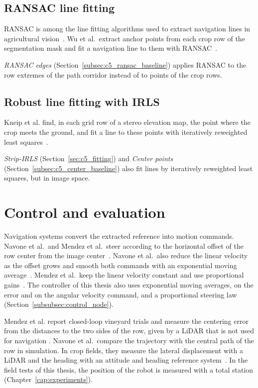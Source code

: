 \subsection{RANSAC line fitting}
\label{subsec:ransac_methods}

RANSAC is among the line fitting algorithms used to extract navigation
lines in agricultural vision~\cite{bai2023vision}. Wu et al.\ extract
anchor points from each crop row of the segmentation mask and fit a
navigation line to them with
RANSAC~\cite{wu2026deeplabv3}.

\textit{RANSAC edges} (Section~\ref{subsec:c5_ransac_baseline}) applies
RANSAC to the row extremes of the path corridor instead of to points of
the crop rows.

\subsection{Robust line fitting with IRLS}
\label{subsec:irls_methods}

Kneip et al. find, in each grid row of a stereo elevation map, the point
where the crop meets the ground, and fit a line to these points with
iteratively reweighted least
squares~\cite{kneip2020cropedge}.

\textit{Strip-IRLS} (Section~\ref{sec:c5_fitting}) and
\textit{Center points} (Section~\ref{subsec:c5_center_baseline}) also fit lines
by iteratively reweighted least squares,
but in image space.

\section{Control and evaluation}
\label{sec:system_integration}

Navigation systems convert the extracted reference into motion commands.
Navone et al.\ and Mendez et al.\ steer according to the
horizontal offset of the row center from the image
center~\cite{navone2025gpsfree,mendez2023vineyards}. Navone et al.\ also
reduce the linear velocity as the offset grows and smooth both
commands with an exponential moving
average~\cite{navone2025gpsfree}. Mendez et al.\ keep the
linear velocity constant and use proportional
gains~\cite{mendez2023vineyards}. The
controller of this thesis also uses exponential moving averages, on the error
and on the angular velocity command, and a proportional steering law
(Section~\ref{subsubsec:control_node}).

Mendez et al. report closed-loop vineyard trials and measure the
centering error from the distances to the two sides of the row, given by
a LiDAR that is not used for navigation
\cite{mendez2023vineyards}. Navone et al.\ compare
the trajectory with the central path of the row in simulation. In crop
fields, they measure the lateral displacement with a LiDAR and the
heading with an attitude and heading reference
system~\cite{navone2025gpsfree}.
In the field tests of this thesis, the position of the robot is measured
with a total station (Chapter~\ref{cap:experiments}).

